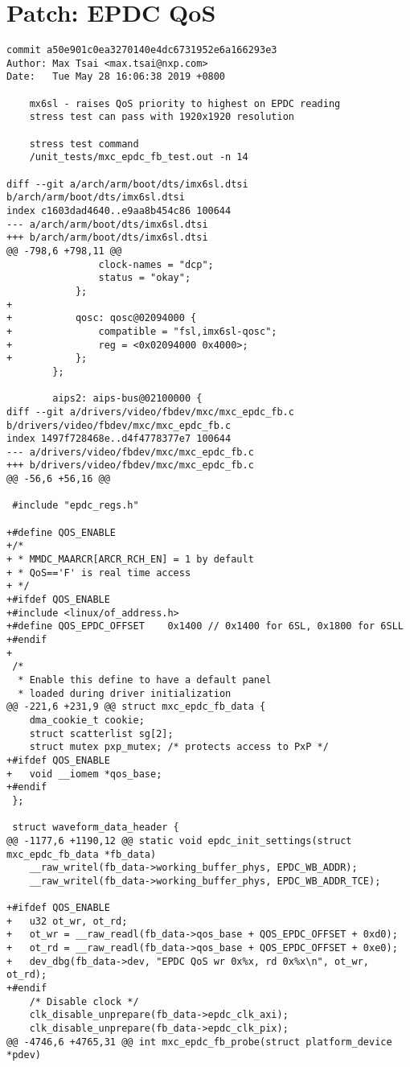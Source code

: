 \documentclass{memoir}
\begin{document}
\chapter{Patch: EPDC QoS}
\label{patchepdcqos}
\begin{verbatim}
commit a50e901c0ea3270140e4dc6731952e6a166293e3
Author: Max Tsai <max.tsai@nxp.com>
Date:   Tue May 28 16:06:38 2019 +0800

    mx6sl - raises QoS priority to highest on EPDC reading
    stress test can pass with 1920x1920 resolution
    
    stress test command
    /unit_tests/mxc_epdc_fb_test.out -n 14

diff --git a/arch/arm/boot/dts/imx6sl.dtsi b/arch/arm/boot/dts/imx6sl.dtsi
index c1603dad4640..e9aa8b454c86 100644
--- a/arch/arm/boot/dts/imx6sl.dtsi
+++ b/arch/arm/boot/dts/imx6sl.dtsi
@@ -798,6 +798,11 @@
 				clock-names = "dcp";
 				status = "okay";
 			};
+
+			qosc: qosc@02094000 {
+				compatible = "fsl,imx6sl-qosc";
+				reg = <0x02094000 0x4000>;
+			};
 		};
 
 		aips2: aips-bus@02100000 {
diff --git a/drivers/video/fbdev/mxc/mxc_epdc_fb.c b/drivers/video/fbdev/mxc/mxc_epdc_fb.c
index 1497f728468e..d4f4778377e7 100644
--- a/drivers/video/fbdev/mxc/mxc_epdc_fb.c
+++ b/drivers/video/fbdev/mxc/mxc_epdc_fb.c
@@ -56,6 +56,16 @@
 
 #include "epdc_regs.h"
 
+#define QOS_ENABLE
+/*
+ * MMDC_MAARCR[ARCR_RCH_EN] = 1 by default
+ * QoS=='F' is real time access
+ */
+#ifdef QOS_ENABLE
+#include <linux/of_address.h>
+#define QOS_EPDC_OFFSET	0x1400 // 0x1400 for 6SL, 0x1800 for 6SLL
+#endif
+
 /*
  * Enable this define to have a default panel
  * loaded during driver initialization
@@ -221,6 +231,9 @@ struct mxc_epdc_fb_data {
 	dma_cookie_t cookie;
 	struct scatterlist sg[2];
 	struct mutex pxp_mutex; /* protects access to PxP */
+#ifdef QOS_ENABLE
+	void __iomem *qos_base;
+#endif
 };
 
 struct waveform_data_header {
@@ -1177,6 +1190,12 @@ static void epdc_init_settings(struct mxc_epdc_fb_data *fb_data)
 	__raw_writel(fb_data->working_buffer_phys, EPDC_WB_ADDR);
 	__raw_writel(fb_data->working_buffer_phys, EPDC_WB_ADDR_TCE);
 
+#ifdef QOS_ENABLE
+	u32 ot_wr, ot_rd;
+	ot_wr = __raw_readl(fb_data->qos_base + QOS_EPDC_OFFSET + 0xd0);
+	ot_rd = __raw_readl(fb_data->qos_base + QOS_EPDC_OFFSET + 0xe0);
+	dev_dbg(fb_data->dev, "EPDC QoS wr 0x%x, rd 0x%x\n", ot_wr, ot_rd);
+#endif
 	/* Disable clock */
 	clk_disable_unprepare(fb_data->epdc_clk_axi);
 	clk_disable_unprepare(fb_data->epdc_clk_pix);
@@ -4746,6 +4765,31 @@ int mxc_epdc_fb_probe(struct platform_device *pdev)
 

\end{verbatim}
\end{document}

